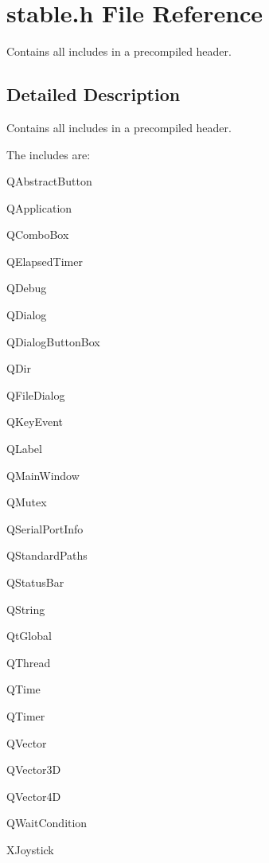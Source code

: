 \hypertarget{a00025}{}\section{stable.\+h File Reference}
\label{a00025}


Contains all includes in a precompiled header.  




\subsection{Detailed Description}
Contains all includes in a precompiled header. 

The includes are\+:
\begin{DoxyItemize}
\item Q\+Abstract\+Button
\item Q\+Application
\item Q\+Combo\+Box
\item Q\+Elapsed\+Timer
\item Q\+Debug
\item Q\+Dialog
\item Q\+Dialog\+Button\+Box
\item Q\+Dir
\item Q\+File\+Dialog
\item Q\+Key\+Event
\item Q\+Label
\item Q\+Main\+Window
\item Q\+Mutex
\item Q\+Serial\+Port\+Info
\item Q\+Standard\+Paths
\item Q\+Status\+Bar
\item Q\+String
\item Qt\+Global
\item Q\+Thread
\item Q\+Time
\item Q\+Timer
\item Q\+Vector
\item Q\+Vector3\+D
\item Q\+Vector4\+D
\item Q\+Wait\+Condition
\item X\+Joystick 
\end{DoxyItemize}